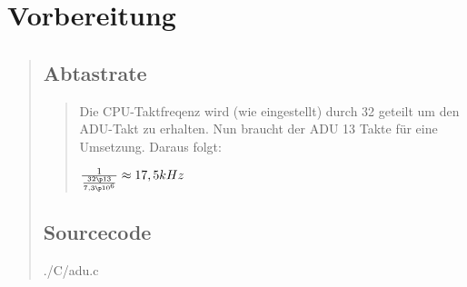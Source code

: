 \section{Vorbereitung}
\begin{quote}
    \subsection{Abtastrate}
    \begin{quote}
        
        Die CPU-Taktfreqenz wird (wie eingestellt) durch 32 geteilt um den ADU-Takt zu erhalten. Nun braucht der ADU 13 Takte für eine Umsetzung.
        Daraus folgt:
        
        $\frac{1}{\frac{32 \p 13}{7,3 \p 10^6}} \approx 17,5 kHz$
        
    \end{quote}

    \subsection{Sourcecode}
    
        {./C/adu.c}
            


    
    
\end{quote}







\bq

\eq



